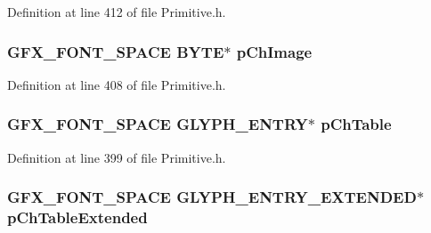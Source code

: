 Definition at line 412 of file Primitive.\+h.

\hypertarget{struct_o_u_t_c_h_a_r___p_a_r_a_m_a21a0e5b19755f1dcc70df378f804a4c9}{}
\subsubsection[{p\+Ch\+Image}]{\setlength{\rightskip}{0pt plus 5cm}G\+F\+X\+\_\+\+F\+O\+N\+T\+\_\+\+S\+P\+A\+C\+E {\bf B\+Y\+T\+E}$\ast$ p\+Ch\+Image}\label{struct_o_u_t_c_h_a_r___p_a_r_a_m_a21a0e5b19755f1dcc70df378f804a4c9}


Definition at line 408 of file Primitive.\+h.

\hypertarget{struct_o_u_t_c_h_a_r___p_a_r_a_m_abf31c96258aa522c572aecf0f3a2f67a}{}
\subsubsection[{p\+Ch\+Table}]{\setlength{\rightskip}{0pt plus 5cm}G\+F\+X\+\_\+\+F\+O\+N\+T\+\_\+\+S\+P\+A\+C\+E {\bf G\+L\+Y\+P\+H\+\_\+\+E\+N\+T\+R\+Y}$\ast$ p\+Ch\+Table}\label{struct_o_u_t_c_h_a_r___p_a_r_a_m_abf31c96258aa522c572aecf0f3a2f67a}


Definition at line 399 of file Primitive.\+h.

\hypertarget{struct_o_u_t_c_h_a_r___p_a_r_a_m_aadf8c332fd7a1637201faf98b6bc3b63}{}
\subsubsection[{p\+Ch\+Table\+Extended}]{\setlength{\rightskip}{0pt plus 5cm}G\+F\+X\+\_\+\+F\+O\+N\+T\+\_\+\+S\+P\+A\+C\+E {\bf G\+L\+Y\+P\+H\+\_\+\+E\+N\+T\+R\+Y\+\_\+\+E\+X\+T\+E\+N\+D\+E\+D}$\ast$ p\+Ch\+Table\+Extended}\label{struct_o_u_t_c_h_a_r___p_a_r_a_m_aadf8c332fd7a1637201faf98b6bc3b63}


